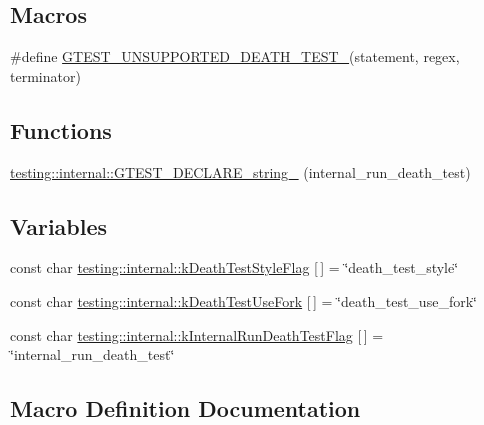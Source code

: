 \subsection*{Macros}
\begin{DoxyCompactItemize}
\item 
\#define \hyperlink{gtest-death-test-internal_8h_a29a145cda8bd2d0c6a78b0ac1d670d18}{G\+T\+E\+S\+T\+\_\+\+U\+N\+S\+U\+P\+P\+O\+R\+T\+E\+D\+\_\+\+D\+E\+A\+T\+H\+\_\+\+T\+E\+S\+T\+\_\+}(statement,  regex,  terminator)
\end{DoxyCompactItemize}
\subsection*{Functions}
\begin{DoxyCompactItemize}
\item 
\hyperlink{namespacetesting_1_1internal_ac20f635c3285878fc1195ce687f23950}{testing\+::internal\+::\+G\+T\+E\+S\+T\+\_\+\+D\+E\+C\+L\+A\+R\+E\+\_\+string\+\_\+} (internal\+\_\+run\+\_\+death\+\_\+test)
\end{DoxyCompactItemize}
\subsection*{Variables}
\begin{DoxyCompactItemize}
\item 
const char \hyperlink{namespacetesting_1_1internal_a008ebfe0c0347d65e5e06e4d310981b3}{testing\+::internal\+::k\+Death\+Test\+Style\+Flag} \mbox{[}$\,$\mbox{]} = \char`\"{}death\+\_\+test\+\_\+style\char`\"{}
\item 
const char \hyperlink{namespacetesting_1_1internal_a32051e2574562b548be3e26a52eaa553}{testing\+::internal\+::k\+Death\+Test\+Use\+Fork} \mbox{[}$\,$\mbox{]} = \char`\"{}death\+\_\+test\+\_\+use\+\_\+fork\char`\"{}
\item 
const char \hyperlink{namespacetesting_1_1internal_a8572303d929880adf30db00952e1c45d}{testing\+::internal\+::k\+Internal\+Run\+Death\+Test\+Flag} \mbox{[}$\,$\mbox{]} = \char`\"{}internal\+\_\+run\+\_\+death\+\_\+test\char`\"{}
\end{DoxyCompactItemize}


\subsection{Macro Definition Documentation}
\mbox{\label{gtest-death-test-internal_8h_a29a145cda8bd2d0c6a78b0ac1d670d18}} 
